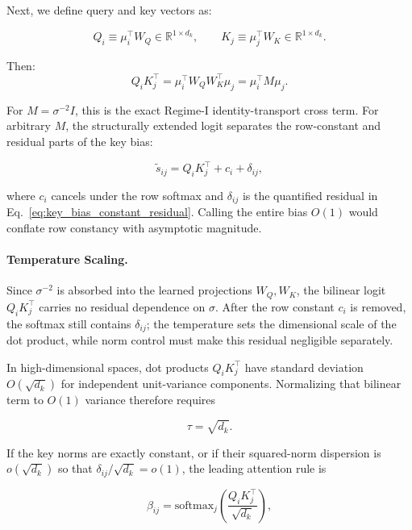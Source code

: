 \documentclass[twoside,11pt]{article}
\begin{document}
Next, we define query and key vectors as:

\begin{equation}
Q_i \equiv \mu_i^\top W_Q \in \mathbb{R}^{1\times d_k}, \qquad K_j \equiv \mu_j^\top W_K \in \mathbb{R}^{1\times d_k}.
\end{equation}

Then:
\begin{equation}
Q_i K_j^\top = \mu_i^\top W_QW_K^\top\mu_j = \mu_i^\top M\mu_j.
\end{equation}

For $M = \sigma^{-2}I$, this is the exact Regime-I identity-transport cross term. For arbitrary $M$, the structurally extended logit separates the row-constant and residual parts of the key bias:

\begin{equation}
\tilde{s}_{ij} = Q_i K_j^\top + c_i + \delta_{ij},
\end{equation}

where $c_i$ cancels under the row softmax and $\delta_{ij}$ is the quantified residual in Eq.~\eqref{eq:key_bias_constant_residual}. Calling the entire bias $O(1)$ would conflate row constancy with asymptotic magnitude.

\paragraph{Temperature Scaling.}

Since $\sigma^{-2}$ is absorbed into the learned projections $W_Q, W_K$, the bilinear logit $Q_iK_j^\top$ carries no residual dependence on $\sigma$. After the row constant $c_i$ is removed, the softmax still contains $\delta_{ij}$; the temperature sets the dimensional scale of the dot product, while norm control must make this residual negligible separately.

In high-dimensional spaces, dot products $Q_iK_j^\top$ have standard deviation $O(\sqrt{d_k})$ for independent unit-variance components. Normalizing that bilinear term to $O(1)$ variance therefore requires

\begin{equation}
\tau = \sqrt{d_k}.
\end{equation}

If the key norms are exactly constant, or if their squared-norm dispersion is $o(\sqrt{d_k})$ so that $\delta_{ij}/\sqrt{d_k}=o(1)$, the leading attention rule is

\begin{equation}
\boxed{\beta_{ij} = \mathrm{softmax}_j\left(\frac{Q_i K_j^\top}{\sqrt{d_k}}\right)},
\end{equation}
\end{document}
